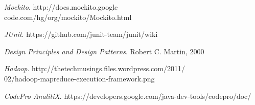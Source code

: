 \documentclass[11pt,twocolumn]{article} %
\begin{document}
\begin{thebibliography}{9}
  \emph{Mockito}.
  http://docs.mockito.google\\code.com/hg/org/mockito/Mockito.html  

  \emph{JUnit}.
  https://github.com/junit-team/junit/wiki

  \emph{Design Principles and Design Patterns}.
  Robert C. Martin,
  2000

  \emph{Hadoop}.
  http://thetechmusings.files.wordpress.com/2011/\\02/hadoop-mapreduce-execution-framework.png
  
  \emph{CodePro AnalitiX}.
  https://developers.google.com/java-dev-tools/codepro/doc/ 
  
\end{thebibliography}
\end{document}
